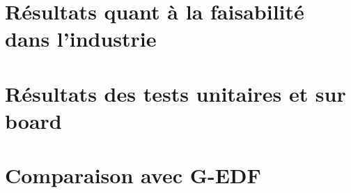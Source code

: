 	
	
	

\section{Résultats quant à la faisabilité dans l'industrie}

	

\section{Résultats des tests unitaires et sur board}

	

\section{Comparaison avec G-EDF}

	